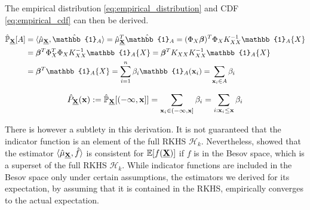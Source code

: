 \documentclass[twoside]{article} \usepackage{aistats2017}
\theoremstyle{definition}
\theoremstyle{remark}
\newcommand{\rv}[1]{\underline{#1}}
\newcommand{\ds}[1]{{#1}}
\begin{document}
		The empirical distribution \eqref{eq:empirical_distribution} and CDF \eqref{eq:empirical_cdf} can then be derived.

		\begin{equation}
		\begin{aligned}
			\hat{\mathbb{P}}_{\bvec{\rv{X}}}[A] &= \langle \hat{\mu}_{\bvec{\rv{X}}}, \hat{\mathbb{1}}_{A} \rangle = \hat{\mu}_{\bvec{\rv{X}}}^{T}\hat{\mathbb{1}}_{A} = (\Phi_{\ds{X}} \bm{\beta})^{T} \Phi_{\ds{X}} K_{\ds{X} \ds{X}}^{-1} \mathbb{1}_{A}\{\ds{X}\} \\
			&= \bm{\beta}^{T} \Phi_{\ds{X}}^{T} \Phi_{\ds{X}} K_{\ds{X} \ds{X}}^{-1} \mathbb{1}_{A}\{\ds{X}\} = \bm{\beta}^{T} K_{\ds{X} \ds{X}} K_{\ds{X} \ds{X}}^{-1} \mathbb{1}_{A}\{\ds{X}\} \\
			&= \bm{\beta}^{T} \mathbb{1}_{A}\{\ds{X}\} = \sum_{i = 1}^{n} \beta_{i} \mathbb{1}_{A}(\bvec{x}_{i}) = \sum_{\bvec{x}_{i} \in A} \beta_{i}
		\end{aligned}
		\label{eq:empirical_distribution}
		\end{equation}

		\begin{equation}
			\hat{P}_{\bvec{\rv{X}}}(\bvec{x}) := \hat{\mathbb{P}}_{\bvec{\rv{X}}}[(-\bvec{\infty}, \bvec{x}]] = \sum_{\bvec{x}_{i} \in (-\bvec{\infty}, \bvec{x}]} \beta_{i} = \sum_{i : \bvec{x}_{i} \leq \bvec{x}} \beta_{i}
		\label{eq:empirical_cdf}
		\end{equation}

		There is however a subtlety in this derivation. It is not guaranteed that the indicator function is an element of the full RKHS $\mathcal{H}_{k}$. Nevertheless, \cite{Kanagawa:RecoveringDistributions} showed that the estimator $\langle \hat{\mu}_{\bvec{\rv{X}}}, \hat{f} \rangle$ is consistent for $\mathbb{E}[f(\bvec{\rv{X}})]$ if $f$ is in the Besov space, which is a superset of the full RKHS $\mathcal{H}_{k}$. While indicator functions are included in the Besov space only under certain assumptions, the estimators we derived for its expectation, by assuming that it is contained in the RKHS, empirically converges to the actual expectation.
\end{document}
